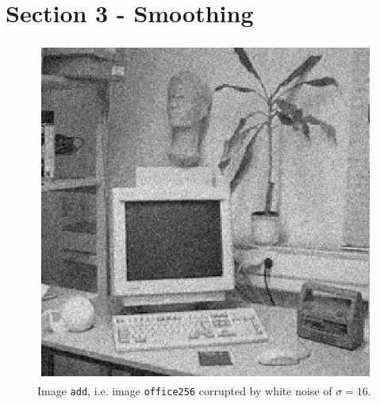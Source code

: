 \section{Section 3 - Smoothing}

\begin{minipage}{\linewidth}
  \begin{minipage}{0.4\linewidth}
    \begin{figure}[H]
      \includegraphics[scale=0.6]{./images/Q17/add_original.eps}
      \caption{Image \texttt{add}, i.e. image \texttt{office256} corrupted by white noise of $\sigma = 16$.}
      \label{fig:Q17_add_original}
    \end{figure}
  \end{minipage}
  \hspace{0.05\linewidth}
  \begin{minipage}{0.4\linewidth}
    \begin{figure}[H]

\end{figure}
\end{minipage}
\end{minipage}
